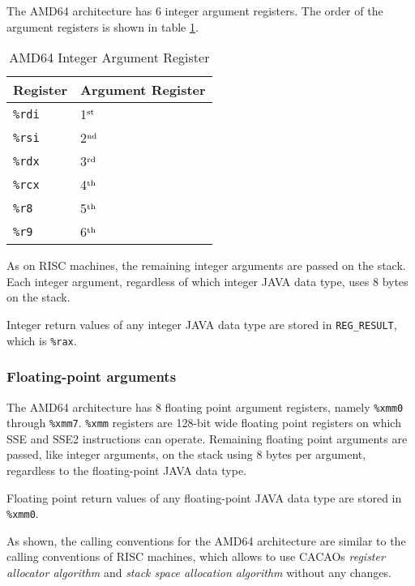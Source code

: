 The AMD64 architecture has 6 integer argument registers. The order of
the argument registers is shown in table
\ref{amd64integerargumentregisters}.

\begin{table}
\begin{center}
\begin{tabular}[b]{|l|l|}
\hline
Register       & Argument Register \\ \hline
\texttt{\%rdi} & 1$^{\rm st}$      \\ \hline
\texttt{\%rsi} & 2$^{\rm nd}$      \\ \hline
\texttt{\%rdx} & 3$^{\rm rd}$      \\ \hline
\texttt{\%rcx} & 4$^{\rm th}$      \\ \hline
\texttt{\%r8}  & 5$^{\rm th}$      \\ \hline
\texttt{\%r9}  & 6$^{\rm th}$      \\ \hline
\end{tabular}
\caption{AMD64 Integer Argument Register}
\label{amd64integerargumentregisters}
\end{center}
\end{table}

As on RISC machines, the remaining integer arguments are passed on the
stack. Each integer argument, regardless of which integer JAVA data
type, uses 8 bytes on the stack.

Integer return values of any integer JAVA data type are stored in
\texttt{REG\_RESULT}, which is \texttt{\%rax}.

\subsubsection{Floating-point arguments}

The AMD64 architecture has 8 floating point argument registers, namely
\texttt{\%xmm0} through \texttt{\%xmm7}. \texttt{\%xmm} registers are
128-bit wide floating point registers on which SSE and SSE2
instructions can operate. Remaining floating point arguments are
passed, like integer arguments, on the stack using 8 bytes per
argument, regardless to the floating-point JAVA data type.

Floating point return values of any floating-point JAVA data type are
stored in \texttt{\%xmm0}.

As shown, the calling conventions for the AMD64 architecture are
similar to the calling conventions of RISC machines, which allows to
use CACAOs \textit{register allocator algorithm} and \textit{stack
space allocation algorithm} without any changes.

